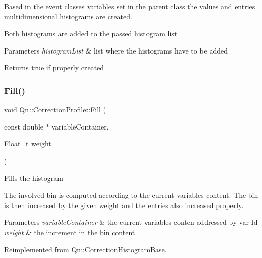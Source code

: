 Based in the event classes variables set in the parent class the values and entries multidimensional histograms are created.

Both histograms are added to the passed histogram list


\begin{DoxyParams}{Parameters}
{\em histogram\+List} & list where the histograms have to be added \\
\hline
\end{DoxyParams}
\begin{DoxyReturn}{Returns}
true if properly created 
\end{DoxyReturn}
\mbox{\label{classQn_1_1CorrectionProfile_a93b95da0e85f546097075ac1958e84e6}} 
\subsubsection{\texorpdfstring{Fill()}{Fill()}}
{\footnotesize\ttfamily void Qn\+::\+Correction\+Profile\+::\+Fill (\begin{DoxyParamCaption}\item[{const double $\ast$}]{variable\+Container,  }\item[{Float\+\_\+t}]{weight }\end{DoxyParamCaption})\hspace{0.3cm}{\ttfamily [virtual]}}

Fills the histogram

The involved bin is computed according to the current variables content. The bin is then increased by the given weight and the entries also increased properly.


\begin{DoxyParams}{Parameters}
{\em variable\+Container} & the current variables conten addressed by var Id \\
\hline
{\em weight} & the increment in the bin content \\
\hline
\end{DoxyParams}


Reimplemented from \mbox{\hyperlink{classQn_1_1CorrectionHistogramBase_a16b7518942714780ec9ceb56bb517f0f}{Qn\+::\+Correction\+Histogram\+Base}}.

\mbox{\label{classQn_1_1CorrectionProfile_a23eab8b418467aa8dc9ff6d590acd5c0}} 

